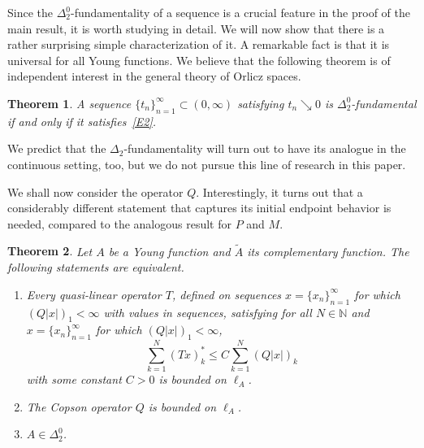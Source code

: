 \documentclass[nointlimits]{amsart}
\numberwithin{equation}{section}
\theoremstyle{plain}
\newtheorem{theorem}{Theorem}[section]
\theoremstyle{definition}
\newcommand{\N}{\mathbb{N}}
\newcommand{\DTwo}{\Delta_2}
\newcommand{\DTwoZ}{\DTwo^0}
\newcommand{\tA}{\tilde{A}}
\newcommand{\lA}{\ell_A}
\begin{document}
Since the $\DTwoZ$-fundamentality of a sequence is a crucial feature in the proof of the main result, it is worth studying in detail. We will now show that there is a rather surprising simple characterization of it. A remarkable fact is that it is universal for all Young functions. We believe that the following theorem is of independent interest in the general theory of Orlicz spaces.

\begin{theorem}\label{T:fundamental-sequence}
    A sequence $\{t_n\}_{n=1}^\infty\subset (0,\infty)$ satisfying $t_n\searrow 0$ is $\DTwoZ$-fundamental if
    and only if it satisfies~\eqref{E2}.
\end{theorem}

We predict that the $\Delta_2$-fundamentality will turn out to have its analogue in the continuous setting, too, but we do not pursue this line of research in this paper.

\medskip

We shall now consider the operator $Q$. Interestingly, it turns out that a considerably different statement that captures its initial endpoint behavior is needed, compared to the analogous result for $P$  and $M$.
\begin{theorem}
    \label{T:main_dual}
Let $A$ be a Young function and $\tA$ its complementary function. The following statements are equivalent.
\begin{enumerate}[(1)]
    \item\label{it:interpolation_dual} Every quasi-linear operator $T$, defined on sequences $x=\{x_n\}_{n=1}^\infty$ for which $(Q|x|)_1< \infty$ with values in sequences, satisfying for all $N\in\N$ and $x=\{x_n\}_{n=1}^\infty$ for which $(Q|x|)_1< \infty$,
    \begin{equation}\label{E:interpolation_dual:HLP}
        \sum_{k=1}^N (Tx)_k^* \leq C \sum_{k=1}^N (Q|x|)_k
    \end{equation}
    with some constant $C>0$ is bounded on $\lA$.
    \item\label{it:average_bdd_dual} The Copson operator $Q$ is bounded on $\lA$.
    \item\label{it:delta20_dual} $A\in\DTwoZ$.
\end{enumerate}
\end{theorem}
\end{document}
